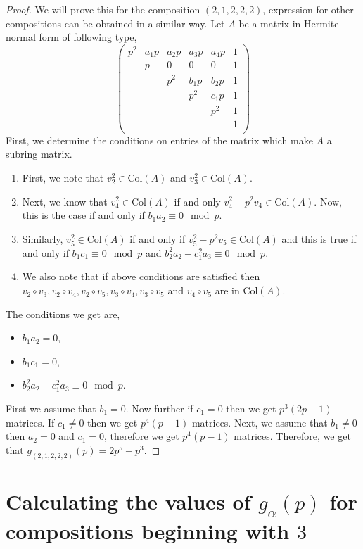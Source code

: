 \documentclass[a4paper]{amsart}
\numberwithin{equation}{section}
\theoremstyle{remark}
\renewcommand{\Col}{\mathrm{Col}}
\begin{document}
\begin{proof}We will prove this for the composition $(2,1,2,2,2)$, expression for other compositions can be obtained in a similar way. Let $A$ be a matrix in Hermite normal form of following type,
$$
    \begin{pmatrix}
        p^2 & a_1p & a_2p & a_3p & a_4p & 1\\
         & p & 0 & 0 &  0 & 1\\
          & & p^2 & b_1p & b_2p & 1\\
          &&& p^2 & c_1p & 1\\
          &&&& p^2& 1\\
          &&&&&1\\
    \end{pmatrix}
    $$
    First, we determine the conditions on entries of the matrix which make $A$ a subring matrix.
    \begin{enumerate}
        \item First, we note that $v_2^2 \in \Col(A)$ and $v_3^2 \in \Col(A)$.
        \item Next, we know that $v_4^2 \in \Col(A)$ if and only $v_4^2-p^2v_4 \in \Col(A)$. Now, this is the case if and only if $b_1a_2 \equiv 0 \mod p$.
        \item Similarly, $v_5^2 \in \Col(A)$ if and only if $v_5^2-p^2v_5 \in \Col(A)$ and this is true if and only if $b_1c_1 \equiv 0 \mod p$ and $b_2^2a_2 - c_1^2a_3 \equiv 0 \mod p$.
        \item We also note that if above conditions are satisfied then $v_2\circ v_3, v_2\circ v_4, v_2\circ v_5, v_3\circ v_4, v_3\circ v_5$ and $v_4\circ v_5$ are in $\Col(A)$.
    \end{enumerate}
    The conditions we get are,
    \begin{itemize}
        \item $b_1a_2 = 0$,
        \item $b_1c_1 = 0$,
        \item $b_2^2a_2-c_1^2a_3 \equiv 0 \mod p$.
    \end{itemize}
    First we assume that $b_1 = 0$. Now further if $c_1 = 0$ then we get $p^3(2p-1)$ matrices. If $c_1 \neq 0$ then we get $p^4(p-1)$ matrices. Next, we assume that $b_1 \neq 0$ then $a_2 = 0$ and $c_1=0$, therefore we get $p^4(p-1)$ matrices. Therefore, we get that $g_{(2,1,2,2,2)}(p) = 2 p^5 - p^3$.
\end{proof}
  
\section{Calculating the values of $g_\alpha(p)$ for compositions beginning with $3$}\label{s 5}
\end{document}
